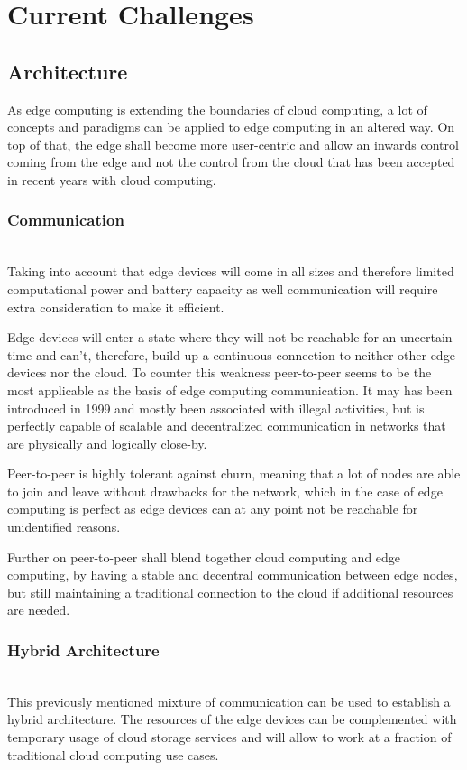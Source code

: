 \section{Current Challenges}\label{sec:main}

\subsection{Architecture}
As edge computing is extending the boundaries of cloud computing, a lot of concepts and paradigms can be applied to edge computing in an altered way. On top of that, the edge shall become more user-centric and allow an inwards control coming from the edge and not the control from the cloud that has been accepted in recent years with cloud computing.

\subsubsection{Communication}\hspace*{\fill} \\
Taking into account that edge devices will come in all sizes and therefore limited computational power and battery capacity as well communication will require extra consideration to make it efficient.

Edge devices will enter a state where they will not be reachable for an uncertain time and can’t, therefore, build up a continuous connection to neither other edge devices nor the cloud.
To counter this weakness peer-to-peer seems to be the most applicable as the basis of edge computing communication. It may has been introduced in 1999 and mostly been associated with illegal activities, but is perfectly capable of scalable and decentralized communication in networks that are physically and logically close-by. 

Peer-to-peer is highly tolerant against churn, meaning that a lot of nodes are able to join and leave without drawbacks for the network, which in the case of edge computing is perfect as edge devices can at any point not be reachable for unidentified reasons.

Further on peer-to-peer shall blend together cloud computing and edge computing, by having a stable and decentral communication between edge nodes, but still maintaining a traditional connection to the cloud if additional resources are needed. 


\subsubsection{Hybrid Architecture}\hspace*{\fill} \\
This previously mentioned mixture of communication can be used to establish a hybrid architecture. The resources of the edge devices can be complemented with temporary usage of cloud storage services  and will allow to work at a fraction of traditional cloud computing use cases.

